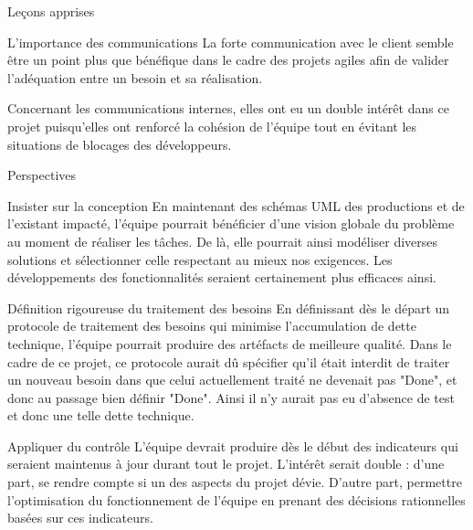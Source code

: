 \documentclass[]{article}
\begin{document}
{\begin{section}{Leçons apprises}
 \begin{subsection}{L'importance des communications}
     La forte communication avec le client semble être un point plus que bénéfique dans le cadre des projets agiles afin de valider l'adéquation entre un besoin et sa réalisation. 

     Concernant les communications internes, elles ont eu un double intérêt dans ce projet puisqu'elles ont renforcé la cohésion de l'équipe tout en évitant les situations de blocages des développeurs.
 \end{subsection}
\end{section}

\begin{section}{Perspectives}
 \begin{subsection}{Insister sur la conception}
     En maintenant des schémas UML des productions et de l'existant impacté, l'équipe pourrait bénéficier d'une vision globale du problème au moment de réaliser les tâches. De là, elle pourrait ainsi modéliser diverses solutions et sélectionner celle respectant au mieux nos exigences. Les développements des fonctionnalités seraient certainement plus efficaces ainsi.
 \end{subsection}

\newpage

 \begin{subsection}{Définition rigoureuse du traitement des besoins}
     En définissant dès le départ un protocole de traitement des besoins qui minimise l'accumulation de dette technique, l'équipe pourrait produire des artéfacts de meilleure qualité. Dans le cadre de ce projet, ce protocole aurait dû spécifier qu'il était interdit de traiter un nouveau besoin dans que celui actuellement traité ne devenait pas "Done", et donc au passage bien définir "Done". Ainsi il n'y aurait pas eu d'absence de test et donc une telle dette technique.
 \end{subsection}

 \begin{subsection}{Appliquer du contrôle}
     L'équipe devrait produire dès le début des indicateurs qui seraient maintenus à jour durant tout le projet. L'intérêt serait double : d'une part, se rendre compte si un des aspects du projet dévie. D'autre part, permettre l'optimisation du fonctionnement de l'équipe en prenant des décisions rationnelles basées sur ces indicateurs.
 \end{subsection}
\end{section}

}
\end{document}
